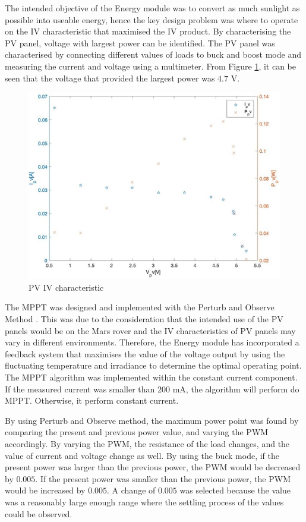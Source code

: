 \documentclass[11pt, a4paper]{article}
\begin{document}
The intended objective of the Energy module was to convert as much sunlight as possible into useable energy, hence the key design problem was where to operate on the IV characteristic that maximised the IV product. By characterising the PV panel, voltage with largest power can be identified. The PV panel was characterised by connecting different values of loads to buck and boost mode and measuring the current and voltage using a multimeter. From Figure \ref{fig:IV_char}, it can be seen that the voltage that provided the largest power was $4.7$ V.

\begin{figure} [h!]
    \centering
    \includegraphics[scale=0.6]{Energy_PV_characteristic.JPG}
    \caption{PV IV characteristic}
    \label{fig:IV_char}
\end{figure}

The MPPT was designed and implemented with the Perturb and Observe Method \cite{PV_current}. This was due to the consideration that the intended use of the PV panels would be on the Mars rover and the IV characteristics of PV panels may vary in different environments. Therefore, the Energy module has incorporated a feedback system that maximises the value of the voltage output by using the fluctuating temperature and irradiance to determine the optimal operating point. The MPPT algorithm was implemented within the constant current component. If the measured current was smaller than $200$ mA, the algorithm will perform do MPPT. Otherwise, it perform constant current.

By using Perturb and Observe method, the maximum power point was found by comparing the present and previous power value, and varying the PWM accordingly. By varying the PWM, the resistance of the load changes, and the value of current and voltage change as well. By using the buck mode, if the present power was larger than the previous power, the PWM would be decreased by $0.005$. If the present power was smaller than the previous power, the PWM would be increased by $0.005$. A change of $0.005$ was selected because the value was a reasonably large enough range where the settling process of the values could be observed.
\end{document}
